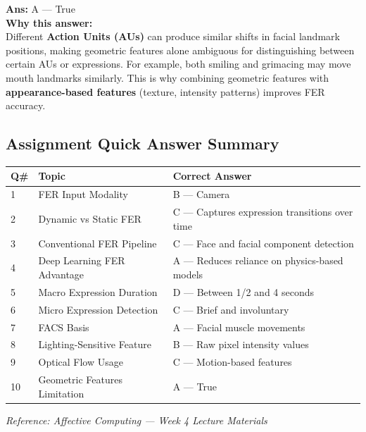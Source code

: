 \documentclass[11pt,a4paper]{article}
\newcommand{\bb}[1]{\textbf{#1}}
\begin{document}
\vspace{0.3cm}
\noindent\textbf{Ans:} A --- True\\[0.2cm]
\textbf{Why this answer:} \\
Different \textbf{Action Units (AUs)} can produce similar shifts in facial landmark positions, making geometric features alone ambiguous for distinguishing between certain AUs or expressions. For example, both smiling and grimacing may move mouth landmarks similarly. This is why combining geometric features with \textbf{appearance-based features} (texture, intensity patterns) improves FER accuracy.
\vspace{0.4cm}

\medskip
\subsection*{Assignment Quick Answer Summary}

\begin{center}
\renewcommand{\arraystretch}{1.4}
\begin{tabular}{|L{0.8cm}|L{6.2cm}|L{8.2cm}|}
\hline
\bb{Q\#} & \bb{Topic} & \bb{Correct Answer} \\
 & FER Input Modality & B --- Camera \\
2 & Dynamic vs Static FER & C --- Captures expression transitions over time \\
3 & Conventional FER Pipeline & C --- Face and facial component detection \\
4 & Deep Learning FER Advantage & A --- Reduces reliance on physics-based models \\
5 & Macro Expression Duration & D --- Between 1/2 and 4 seconds \\
6 & Micro Expression Detection & C --- Brief and involuntary \\
7 & FACS Basis & A --- Facial muscle movements \\
8 & Lighting-Sensitive Feature & B --- Raw pixel intensity values \\
9 & Optical Flow Usage & C --- Motion-based features \\
10 & Geometric Features Limitation & A --- True \\
\hline
\end{tabular}
\end{center}

\medskip
{\small\textit{Reference: Affective Computing --- Week 4 Lecture Materials}}
\end{document}
